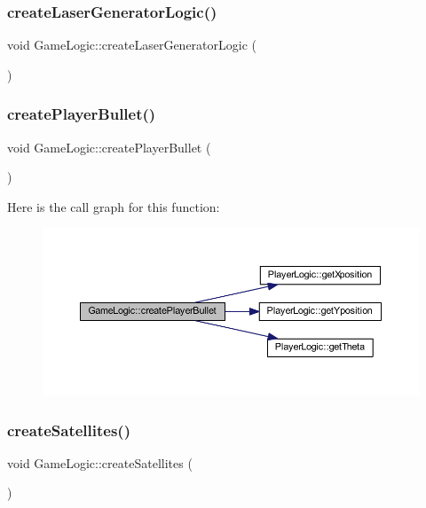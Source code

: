 \subsubsection{\texorpdfstring{create\+Laser\+Generator\+Logic()}{createLaserGeneratorLogic()}}
{\footnotesize\ttfamily void Game\+Logic\+::create\+Laser\+Generator\+Logic (\begin{DoxyParamCaption}{ }\end{DoxyParamCaption})}

\mbox{\label{class_game_logic_a05dec53eb3c36cf1a669c973fa0b16ae}} 
\subsubsection{\texorpdfstring{create\+Player\+Bullet()}{createPlayerBullet()}}
{\footnotesize\ttfamily void Game\+Logic\+::create\+Player\+Bullet (\begin{DoxyParamCaption}{ }\end{DoxyParamCaption})}

Here is the call graph for this function\+:
\nopagebreak
\begin{figure}[H]
\begin{center}
\leavevmode
\includegraphics[width=350pt]{class_game_logic_a05dec53eb3c36cf1a669c973fa0b16ae_cgraph}
\end{center}
\end{figure}
\mbox{\label{class_game_logic_ab2b56581a56239bb837e6eeea0a2991d}} 
\subsubsection{\texorpdfstring{create\+Satellites()}{createSatellites()}}
{\footnotesize\ttfamily void Game\+Logic\+::create\+Satellites (\begin{DoxyParamCaption}{ }\end{DoxyParamCaption})}

